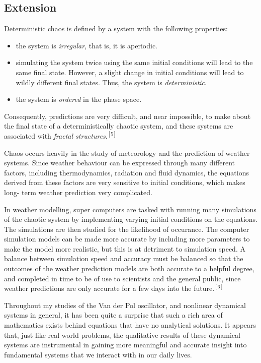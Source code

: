 \documentclass[11pt,a4paper]{amsart}
\begin{document}
\subsection*{Extension} Deterministic chaos is defined by a system with the following properties:
\begin{itemize}
\item the system is \textit{irregular}, that is, it is aperiodic.
\item simulating the system twice using the same initial conditions will lead to the same final state. However, a slight change in initial conditions will lead to wildly different final states. Thus, the system is \textit{deterministic}.
\item the system is \textit{ordered} in the phase space.
\end{itemize}Consequently, predictions are very difficult, and near impossible, to make about the final state of a deterministically chaotic system, and these systems are associated with \textit{fractal structures}.$^{[5]}$

Chaos occurs heavily in the study of meteorology and the prediction of weather systems. Since weather behaviour can be expressed through many different factors, including thermodynamics, radiation and fluid dynamics, the equations derived from these factors are very sensitive to initial conditions, which makes long- term weather prediction very complicated. 

In weather modelling, super computers are tasked with running many simulations of the chaotic system by implementing varying initial conditions on the equations. The simulations are then studied for the likelihood of occurance. The computer simulation models can be made more accurate by including more parameters to make the model more realistic, but this is at detriment to simulation speed. A balance between simulation speed and accuracy must be balanced so that the outcomes of the weather prediction models are both accurate to a helpful degree, and completed in time to be of use to scientists and the general public, since weather predictions are only accurate for a few days into the future.$^{[6]}$

Throughout my studies of the Van der Pol oscillator, and nonlinear dynamical systems in general, it has been quite a surprise that such a rich area of mathematics exists behind equations that have no analytical solutions. It appears that, just like real world problems, the qualitative results of these dynamical systems are instrumental in gaining more meaningful and accurate insight into fundamental systems that we interact with in our daily lives.
\end{document}
